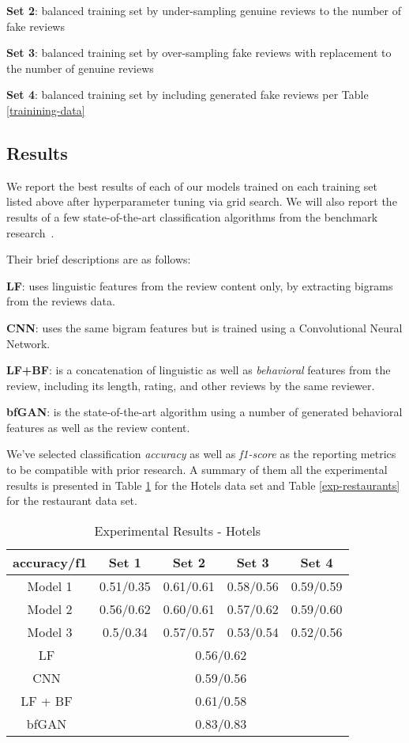 \documentclass[conference, 11pt]{IEEEtran} %
\theoremstyle{plain}
\theoremstyle{definition}
\begin{document}
 \textbf{Set 2}: balanced training set by under-sampling genuine reviews to the number of fake reviews
 
 \textbf{Set 3}: balanced training set by over-sampling fake reviews with replacement to the number of genuine reviews
 
 \textbf{Set 4}: balanced training set by including generated fake reviews per Table \ref{trainining-data}

\subsection{Results}
We report the best results of each of our models trained on each training set listed above after hyperparameter tuning via grid search. We will also report the results of a few state-of-the-art classification algorithms from the benchmark research~\cite{Tang2020}.

Their brief descriptions are as follows:

\textbf{LF}: uses linguistic features from the review content only, by extracting bigrams from the reviews data.

\textbf{CNN}: uses the same bigram features but is trained using a Convolutional Neural Network.

\textbf{LF+BF}: is a concatenation of linguistic as well as \textit{behavioral} features from the review, including its length, rating, and other reviews by the same reviewer.

\textbf{bfGAN}: is the state-of-the-art algorithm using a number of generated behavioral features as well as the review content.

We've selected classification \textit{accuracy} as well as \textit{f1-score} as the reporting metrics to be compatible with prior research. A summary of them all the experimental results is presented in Table \ref{exp-hotels} for the Hotels data set and Table \ref{exp-restaurants} for the restaurant data set.

\begin{table}[H]
\small
\caption{Experimental Results - Hotels}
\centering
\begin{tabular}{|c|c|c|c|c|}
\hline
 accuracy/f1 & Set 1 & Set 2 & Set 3 & Set 4 \\ \hline
 
Model 1 & 0.51/0.35 & 0.61/0.61 & 0.58/0.56 & 0.59/0.59 \\ \hline
Model 2 & 0.56/0.62 & 0.60/0.61 & 0.57/0.62 & 0.59/0.60 \\ \hline
Model 3 & 0.5/0.34 & 0.57/0.57 & 0.53/0.54 & 0.52/0.56 \\ \hline
LF~\cite{Tang2020} & \multicolumn{4}{c|}{0.56/0.62} \\ \hline
CNN~\cite{Tang2020} & \multicolumn{4}{c|}{0.59/0.56} \\ \hline
LF + BF~\cite{Tang2020} & \multicolumn{4}{c|}{0.61/0.58} \\ \hline
bfGAN~\cite{Tang2020} & \multicolumn{4}{c|}{0.83/0.83} \\
\hline
\end{tabular}
\label{exp-hotels}
\end{table}
\end{document}
